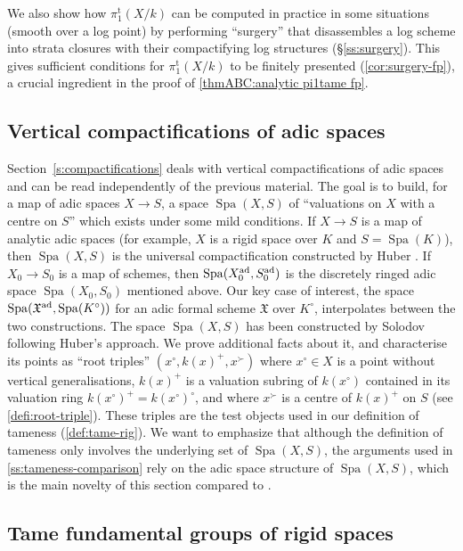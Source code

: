 \documentclass[a4paper,twoside,11pt,reqno]{amsart}
\DeclareRobustCommand{\SkipTocEntry}[5]{}
\newcommand{\fX}{{\mathfrak{X}}}
\DeclareMathOperator{\Spa}{Spa}
\newcommand{\pitame}{\pi_1^{\mathrm{t}}}
\theoremstyle{definition}
\numberwithin{equation}{subsection}
\begin{document}
\noindent 
We also show how $\pitame(X/k)$ can be computed in practice in some situations (smooth over a log point) by performing ``surgery'' that disassembles a log scheme into strata closures with their compactifying log structures (\S\ref{ss:surgery}). This gives sufficient conditions for $\pitame(X/k)$ to be finitely presented (\cref{cor:surgery-fp}), a crucial ingredient in the proof of \cref{thmABC:analytic pi1tame fp}. 

\subsection*{Vertical compactifications of adic spaces}

Section~\ref{s:compactifications} deals with vertical compactifications of adic spaces and can be read independently of the previous material. The goal is to build, for a map of adic spaces $X\to S$, a space $\Spa(X,S)$ of ``valuations on $X$ with a centre on $S$'' which exists under some mild conditions. If $X\to S$ is a map of analytic adic spaces (for example, $X$ is a rigid space over $K$ and $S=\Spa(K)$), then $\Spa(X,S)$ is the universal compactification constructed by Huber \cite[\S 5]{HuberBook}. If $X_0\to S_0$ is a map of schemes, then $\Spa(X_0^{\rm ad}, S_0^{\rm ad})$ is the discretely ringed adic space $\Spa(X_0,S_0)$ mentioned above. Our key case of interest, the space $\Spa(\fX^{\rm ad}, \Spa(K^\circ))$ for an adic formal scheme $\fX$ over $K^\circ$, interpolates between the two constructions. The space $\Spa(X,S)$ has been constructed by Solodov \cite{Solodov-vertical-compactification} following Huber's approach. We prove additional facts about it, and characterise its points as ``root triples'' $(x^\circ, k(x)^+, x^\succ)$ where $x^\circ\in X$ is a point without vertical generalisations, $k(x)^+$ is a valuation subring of $k(x^\circ)$ contained in its valuation ring $k(x^\circ)^+=k(x^\circ)^\circ$, and where $x^\succ$ is a centre of $k(x)^+$ on $S$ (see \cref{defi:root-triple}). These triples are the test objects used in our definition of tameness (\cref{def:tame-rig}).
We want to emphasize that although the definition of tameness only involves the underlying set of $\Spa(X,S)$, the arguments used in \cref{ss:tameness-comparison} rely on the adic space structure of $\Spa(X,S)$, which is the main novelty of this section compared to \cite{Solodov-vertical-compactification}.

\subsection*{Tame fundamental groups of rigid spaces} 
\end{document}
